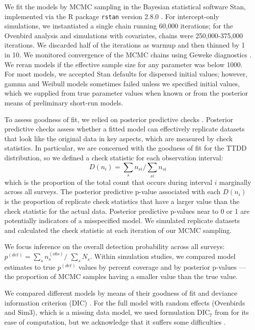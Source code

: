 \documentclass[useAMS,usenatbib,referee,12pt]{article}
\begin{document}
We fit the models by MCMC sampling in the Bayesian statistical software Stan, implemented via the R package \texttt{rstan} version 2.8.0 \citep{Rstan2015}.  
For intercept-only simulations, we instantiated a single chain running 60,000 iterations; for the Ovenbird analysis and simulations with covariates, chains were 250,000-375,000 iterations.  
We discarded half of the iterations as warmup and then thinned by 1 in 10.  
We monitored convergence of the MCMC chains using Geweke diagnostics \citep{Geweke1991}.  
We reran models if the effective sample size for any parameter was below 1000.  
For most models, we accepted Stan defaults for dispersed initial values; however, gamma and Weibull models sometimes failed unless we specified initial values, which we supplied from true parameter values when known or from the posterior means of preliminary short-run models.

To assess goodness of fit, we relied on posterior predictive checks \citep{Gelman1996}.  
Posterior predictive checks assess whether a fitted model can effectively replicate datasets that look like the original data in key aspects, which are measured by check statistics.  
In particular, we are concerned with the goodness of fit for the TTDD distribution, so we defined a check statistic for each observation interval:
\[D(n_i) = \sum\limits_{s} n_{si} \big/ \sum\limits_{si} n_{si}\]
which is the proportion of the total count that occurs during interval $i$ marginally across all surveys.  
The posterior predictive p-value associated with each $D(n_i)$ is the proportion of replicate check statistics that have a larger value than the check statistic for the actual data.  
Posterior predictive p-values near to 0 or 1 are potentially indicators of a misspecified model.
We simulated replicate datasets and calculated the check statistic at each iteration of our MCMC sampling.  

We focus inference on the overall detection probability across all surveys: $p^{(det)} = \sum\limits_{s}n_{s}^{(obs)}\big/$ $\sum\limits_{s}N_{s}$.  
Within simulation studies, we compared model estimates to true $p^{(det)}$ values by percent coverage and by posterior p-values --- the proportion of MCMC samples having a smaller value than the true value.  

We compared different models by means of their goodness of fit and deviance information criterion (DIC) \citep{Spiegelhalter2002}.  
For the full model with random effects (Ovenbirds and Sim3), which is a missing data model, we used formulation DIC$_7$ from \citet{Celeux2006} for its ease of computation, but we acknowledge that it suffers some difficulties \citep{Celeux2006, Li2014}.
\end{document}
